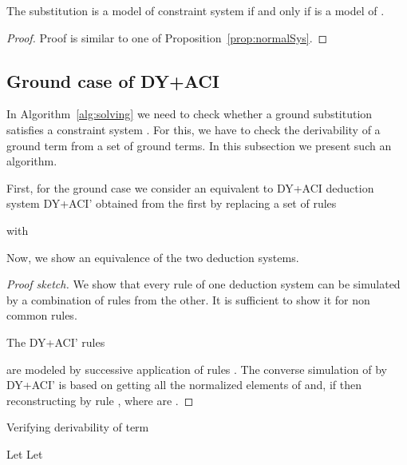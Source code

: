\begin{prop}\label{prop:normalSigma}
	The substitution  is a model of constraint system  if and only if  is a model of .
\begin{proof}
	Proof is similar to one of Proposition~\ref{prop:normalSys}.
\end{proof}

\end{prop}






\subsection{Ground case of DY+ACI}\label{subs:groundcase}
In Algorithm~\ref{alg:solving} we need to check whether a ground substitution  satisfies a constraint system . For this, we have to check 
the derivability of a ground term from a set of ground terms. In this subsection we  present such an algorithm.

First, for the ground case we consider an  equivalent to DY+ACI deduction system DY+ACI' obtained from the first by replacing a set of rules 
 
with   
 


Now, we show an equivalence of the two deduction systems.
 
\begin{lemma}
	
\begin{proof}[Proof sketch] 

We show that every   rule of one deduction system can be simulated by a combination 
of rules from the other. It is sufficient to show it for non common rules. 

The DY+ACI' rules
	 
	are modeled by successive application of rules
	.
	The converse simulation of  by DY+ACI'
is based on getting all the normalized elements of  
	and, if  then reconstructing  by rule ,
	where  are .
\end{proof}

\end{lemma}

\begin{algorithm}[H]
  \caption{Verifying derivability of term}
  \label{alg:ground}
  \KwOut{}
  \BlankLine
Let  \;
Let \;
\end{algorithm}


